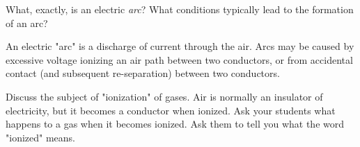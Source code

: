 

What, exactly, is an electric {\it arc}?  What conditions typically lead to the formation of an arc?







An electric "arc" is a discharge of current through the air.  Arcs may be caused by excessive voltage ionizing an air path between two conductors, or from accidental contact (and subsequent re-separation) between two conductors.







Discuss the subject of "ionization" of gases.  Air is normally an insulator of electricity, but it becomes a conductor when ionized.  Ask your students what happens to a gas when it becomes ionized.  Ask them to tell you what the word "ionized" means.





